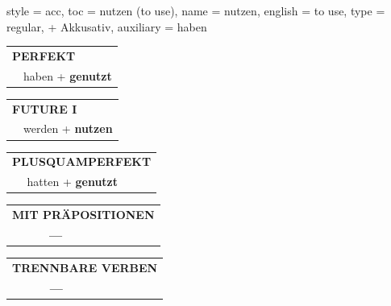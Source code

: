 \begin{verbentry}{
  style = {acc},
  toc = {nutzen (to use)},
  name = {nutzen},
  english = {to use},
  type = {regular, + Akkusativ},
  auxiliary = {haben}
}
    \vspace{10pt}

 \begin{tabular}{rl}
     \multicolumn{2}{l}{\textbf{PERFEKT}}\\
  &  haben + \textbf{genutzt}\\
  \end{tabular}
\hfill
   \begin{tabular}{rl}
   
    \multicolumn{2}{l}{\textbf{FUTURE I} }\\
  &  werden + \textbf{nutzen}\\
 
  \end{tabular}
\hfill
   \begin{tabular}{rl}
      \multicolumn{2}{l}{\textbf{PLUSQUAMPERFEKT}}\\
  &  hatten + \textbf{genutzt}\\
  \end{tabular}
  
  
\vspace{10pt}

\begin{tabular}{lll}
\multicolumn{3}{l}{\textbf{MIT PRÄPOSITIONEN}}\\
& \textbf{---} & \\
\end{tabular}
\hfill
\begin{tabular}{lll}
\multicolumn{3}{l}{\textbf{TRENNBARE VERBEN}}\\
& \textbf{---} & \\
\end{tabular}
\vspace{-5pt}
\end{verbentry}
